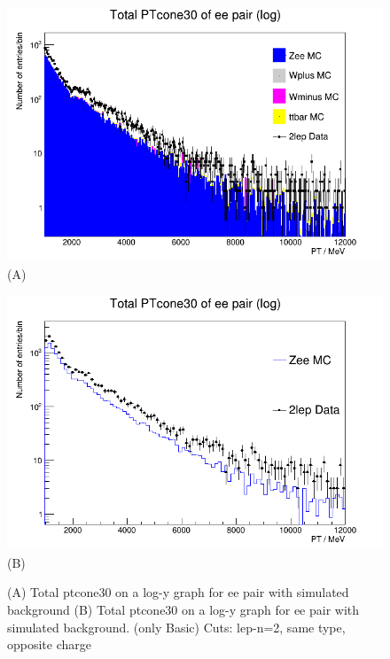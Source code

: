 \begin{figure}[h!]
    \centering
    \begin{minipage}{0.5\textwidth}
        \centering
        \includegraphics[width=\linewidth]{plots/27-02-2021/All-stack-Zee-fast_(basic-cuts_2lep=ee_opp-c)_27-02-2021_09-50.png}
        (A)
    \end{minipage}\hfill
    \begin{minipage}{0.5\textwidth}
        \centering
        \includegraphics[width=\linewidth]{plots/27-02-2021/2-Stack-Zee-2lep-fast_(basic-ee_opp-c)_27-02-21_10-00).png}
        (B)
    \end{minipage}
    \caption{(A) Total ptcone30 on a log-y graph for ee pair with simulated background (B) Total ptcone30 on a log-y graph for ee pair with simulated background. (only Basic) Cuts: lep-n=2, same type, opposite charge}
    \label{fig:All-stack-Zll-fast_(basic-cuts_2lep=ll_opp-c)_27-02-2021_09-50}
\end{figure}


